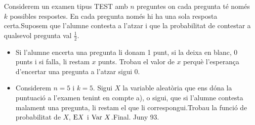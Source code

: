 \begin{probres}
{Considerem un examen tipus TEST amb $n$ preguntes on cada pregunta t\'e
nom\'es $k$ possibles respostes. En cada pregunta nom\'es hi ha una sola resposta
certa.\newline\indent Suposem que l'alumne contesta a l'atzar i que la
probabilitat de contestar a qualsevol pregunta val $\frac{1}{2}$. 
\begin{itemize}
\item[a)] {Si
l'alumne encerta una pregunta li donam 1 punt, si la deixa en blanc, 0 punts i
si falla, li restam $x$ punts. Trobau el valor de $x$ perqu\`e l'esperan\c{c}a
d'encertar una pregunta a l'atzar sigui $0$.}
\item[b)] {Considerem $n=5$ i $k=5$. Sigui $X$ la variable aleat\`oria que ens
d\'ona la puntuaci\'o a l'examen tenint en compte a), o sigui, que si l'alumne
contesta malament una pregunta, li restam el que li
correspongui.\newline Trobau la funci\'o de probabilitat de $X$, ${\rm E} X$ i
$\hbox{Var }X$.\newline\hfill{\footnotesize Final. Juny 93.}}
\end{itemize}}
\end{probres}

